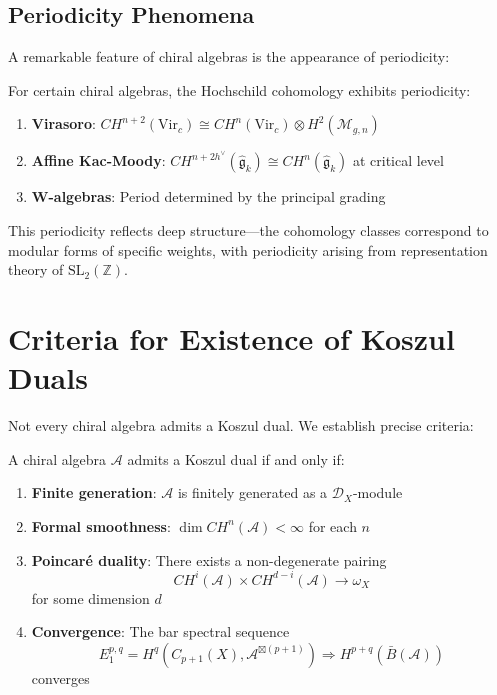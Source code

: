 \subsection{Periodicity Phenomena}

A remarkable feature of chiral algebras is the appearance of periodicity:

\begin{theorem}
For certain chiral algebras, the Hochschild cohomology exhibits periodicity:
\begin{enumerate}
\item \textbf{Virasoro}: $CH^{n+2}(\text{Vir}_c) \cong CH^n(\text{Vir}_c) \otimes H^2(\mathcal{M}_{g,n})$ 
\item \textbf{Affine Kac-Moody}: $CH^{n+2h^\vee}(\widehat{\mathfrak{g}}_k) \cong CH^n(\widehat{\mathfrak{g}}_k)$ at critical level
\item \textbf{W-algebras}: Period determined by the principal grading
\end{enumerate}
\end{theorem}

This periodicity reflects deep structure—the cohomology classes correspond to modular forms of specific weights, with periodicity arising from representation theory of $\text{SL}_2(\mathbb{Z})$.

\section{Criteria for Existence of Koszul Duals}

Not every chiral algebra admits a Koszul dual. We establish precise criteria:

\begin{theorem}
A chiral algebra $\mathcal{A}$ admits a Koszul dual if and only if:
\begin{enumerate}
\item \textbf{Finite generation}: $\mathcal{A}$ is finitely generated as a $\mathcal{D}_X$-module
\item \textbf{Formal smoothness}: $\dim CH^n(\mathcal{A}) < \infty$ for each $n$
\item \textbf{Poincaré duality}: There exists a non-degenerate pairing
   $$CH^i(\mathcal{A}) \times CH^{d-i}(\mathcal{A}) \to \omega_X$$
   for some dimension $d$
\item \textbf{Convergence}: The bar spectral sequence 
   $$E_1^{p,q} = H^q(C_{p+1}(X), \mathcal{A}^{\boxtimes(p+1)}) \Rightarrow H^{p+q}(\bar{B}(\mathcal{A}))$$
   converges
\end{enumerate}
\end{theorem}

